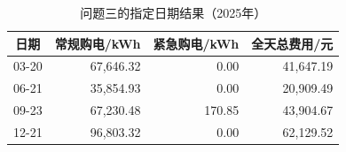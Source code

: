 \par
\begin{table}[!htbp]
\centering
\caption{问题三的指定日期结果（2025年）}\label{tab:q3-days-summary}
\normalsize
\begin{tabular}{lrrr}
\toprule
\multicolumn{1}{c}{日期} & \multicolumn{1}{c}{常规购电/kWh} & \multicolumn{1}{c}{紧急购电/kWh} & \multicolumn{1}{c}{全天总费用/元} \\
\midrule
03-20 & 67,646.32 & 0.00 & 41,647.19 \\
06-21 & 35,854.93 & 0.00 & 20,909.49 \\
09-23 & 67,230.48 & 170.85 & 43,904.67 \\
12-21 & 96,803.32 & 0.00 & 62,129.52 \\
\bottomrule
\end{tabular}
\end{table}
\par
